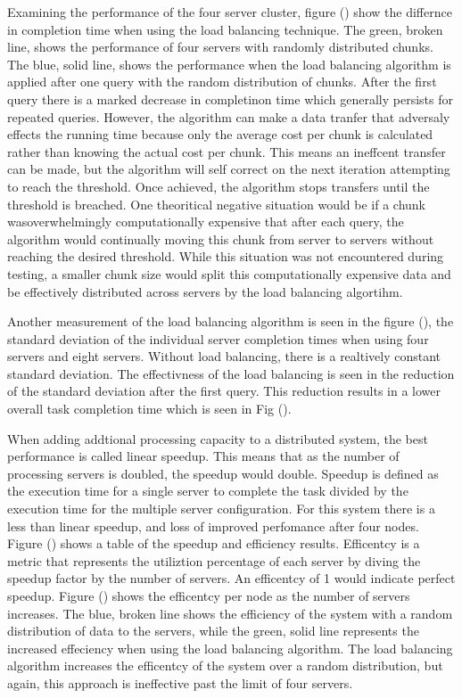 \documentclass{article}
\begin{document}
\begin{multicols}{2}
Examining the performance of the four server cluster, figure () show the differnce in completion time when using the load balancing technique.  The green, broken line, shows the performance of four servers with randomly distributed chunks. The blue, solid line, shows the performance when the load balancing algorithm is applied after one query with the random distribution of chunks.  After the first query there is a marked decrease in completinon time which generally persists for repeated queries.  However, the algorithm can make a data tranfer that adversaly effects the running time because only the average cost per chunk is calculated rather than knowing the actual cost per chunk. This means an ineffcent transfer can be made, but the algorithm will self correct on the next iteration attempting to reach the threshold. Once achieved, the algorithm stops transfers until the threshold is breached. One theoritical negative situation would be if a chunk wasoverwhelmingly computationally expensive that after each query, the algorithm would continually moving this chunk from server to servers without reaching the desired threshold.  While this situation was not encountered during testing, a smaller chunk size would split this computationally expensive data and be effectively distributed across servers by the load balancing algortihm. 

Another measurement of the load balancing algorithm is seen in the figure (), the standard deviation of the individual server completion times when using four servers and eight servers.  Without load balancing, there is a realtively constant standard deviation.  The effectivness of the load balancing is seen in the reduction of the standard deviation after the first query.  This reduction results in a lower overall task completion time which is seen in Fig ().

When adding addtional processing capacity to a distributed system, the best performance is called linear speedup.  This means that as the number of processing servers is doubled, the speedup would double. Speedup is defined as the execution time for a single server to complete the task divided by the execution time for the multiple server configuration.  For this system there is a less than linear speedup, and loss of improved perfomance after four nodes.  Figure () shows a table of the speedup and efficiency results.  Efficentcy is a metric that represents the utiliztion percentage of each server by diving the speedup factor by the number of servers.  An efficentcy of 1 would indicate perfect speedup.  Figure () shows the efficentcy per node as the number of servers increases.  The blue, broken line shows the efficiency of the system with a random distribution of data to the servers, while the green, solid line represents the increased effeciency when using the load balancing algorithm.  The load balancing algorithm increases the efficentcy of the system over a random distribution, but again, this approach is ineffective past the limit of four servers.


\end{multicols}
\end{document}

